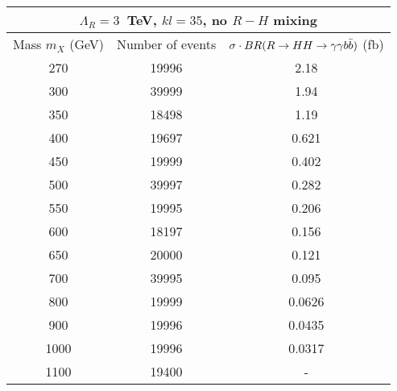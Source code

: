 \begin{tabular}{|c|c|c|}
\hline
\multicolumn{3}{|c|}{ $\Lambda_R = 3$~TeV, $kl = 35$, no $R-H$ mixing}\\ \hline \hline
Mass $m_X$ (GeV) & Number of events & $\sigma \cdot BR(R\rightarrow HH \rightarrow \gamma\gamma b\bar{b})$ (fb) \\
\hline
270 & 19996& 2.18 \\
300 & 39999& 1.94\\
350 & 18498& 1.19 \\
400 & 19697& 0.621 \\
450 & 19999& 0.402 \\
500 & 39997& 0.282 \\
550 & 19995& 0.206 \\
600 & 18197& 0.156 \\
650 & 20000& 0.121 \\
700 & 39995& 0.095 \\
800 & 19999& 0.0626 \\
900 & 19996& 0.0435 \\
1000& 19996& 0.0317\\
1100& 19400& - \\
\hline
\end{tabular}
